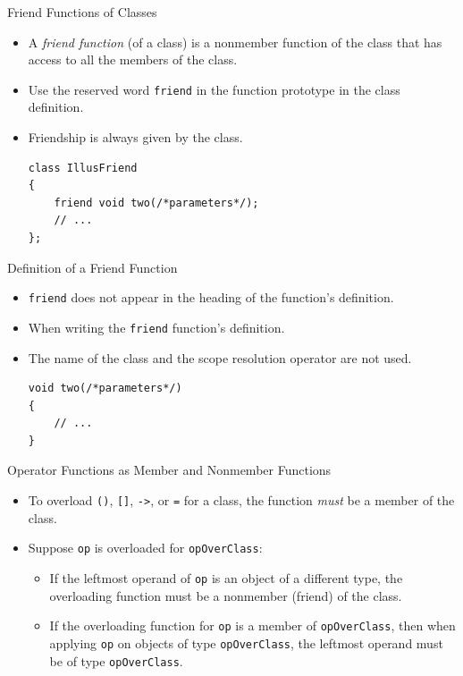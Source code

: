 \documentclass[14pt,aspectratio=1610, hyperref={pdfpagelayout=SinglePage}]{beamer}
\begin{document}
\begin{frame}[fragile]{Friend Functions of Classes}
\protect\hypertarget{friend-functions-of-classes}{}
\begin{itemize}
\item
  A \emph{friend function} (of a class) is a nonmember function of the class 
  that has access to all the members of the class.
\item
  Use the reserved word \lstinline{friend} in the function prototype in the
  class definition.
\item
  Friendship is always given by the class.

\begin{lstlisting}[basicstyle=\ttfamily\small]
class IllusFriend
{
    friend void two(/*parameters*/);
    // ...
};
\end{lstlisting}
\end{itemize}
\end{frame}

\begin{frame}[fragile]{Definition of a Friend Function}
\protect\hypertarget{definition-of-a-friend-function}{}
\begin{itemize}
\item
  \lstinline{friend} does not appear in the heading of the function's
  definition.
\item
  When writing the \lstinline{friend} function's definition.
\item
  The name of the class and the scope resolution operator are not used.

\begin{lstlisting}[basicstyle=\ttfamily\small]
void two(/*parameters*/)
{
    // ...
}
\end{lstlisting}
\end{itemize}
\end{frame}

\begin{frame}[fragile]{Operator Functions as Member and Nonmember
Functions}
\protect\hypertarget{operator-functions-as-member-and-nonmember-functions}{}
\begin{itemize}
\item
  To overload \lstinline{()}, \lstinline{[]},
  \lstinline{->}, or \lstinline{=} for a class,
  the function \textit{must} be a member of the class.
\item
  Suppose \lstinline{op} is overloaded for \lstinline{opOverClass}:
  \begin{itemize}
  \item
    If the leftmost operand of \lstinline{op} is an object of a different
    type, the overloading function must be a nonmember (friend) of the
    class.
  \item
    If the overloading function for \lstinline{op} is a member of
    \lstinline{opOverClass}, then when applying \lstinline{op} on objects of
    type \lstinline{opOverClass}, the leftmost operand must be of type
    \lstinline{opOverClass}.
  \end{itemize}
\end{itemize}
\end{frame}
\end{document}
